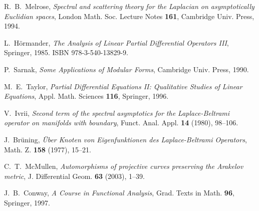 \documentclass[12pt]{amsart}
\numberwithin{equation}{section}
\theoremstyle{plain}
\theoremstyle{definition}
\theoremstyle{remark}
\begin{document}
\begin{thebibliography}{99}
R.~B.~Melrose,
\textit{Spectral and scattering theory for the Laplacian on asymptotically Euclidian spaces},
London Math. Soc. Lecture Notes \textbf{161}, Cambridge Univ. Press, 1994.

L.~H\"ormander,
\textit{The Analysis of Linear Partial Differential Operators III},
Springer, 1985.
ISBN 978-3-540-13829-9.

P.~Sarnak,
\textit{Some Applications of Modular Forms},
Cambridge Univ. Press, 1990.

M.~E.~Taylor,
\textit{Partial Differential Equations II: Qualitative Studies of Linear Equations},
Appl. Math. Sciences \textbf{116}, Springer, 1996.

V.~Ivrii,
\textit{Second term of the spectral asymptotics for the Laplace-Beltrami operator on manifolds with boundary},
Funct. Anal. Appl. \textbf{14} (1980), 98--106.

J.~Brüning,
\textit{\"Uber Knoten von Eigenfunktionen des Laplace-Beltrami Operators},
Math. Z. \textbf{158} (1977), 15--21.

C.~T.~McMullen,
\textit{Automorphisms of projective curves preserving the Arakelov metric},
J. Differential Geom. \textbf{63} (2003), 1--39.

J.~B.~Conway,
\textit{A Course in Functional Analysis},
Grad. Texts in Math. \textbf{96}, Springer, 1997.

\end{thebibliography}
\end{document}
